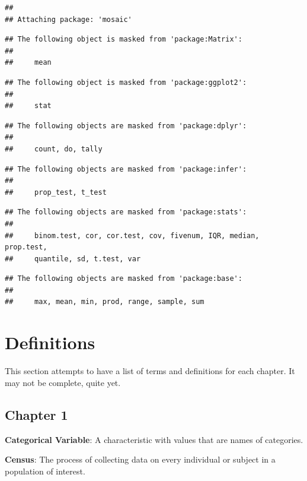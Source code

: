 \documentclass[
]{book}
\begin{document}
\begin{verbatim}
## 
## Attaching package: 'mosaic'
\end{verbatim}

\begin{verbatim}
## The following object is masked from 'package:Matrix':
## 
##     mean
\end{verbatim}

\begin{verbatim}
## The following object is masked from 'package:ggplot2':
## 
##     stat
\end{verbatim}

\begin{verbatim}
## The following objects are masked from 'package:dplyr':
## 
##     count, do, tally
\end{verbatim}

\begin{verbatim}
## The following objects are masked from 'package:infer':
## 
##     prop_test, t_test
\end{verbatim}

\begin{verbatim}
## The following objects are masked from 'package:stats':
## 
##     binom.test, cor, cor.test, cov, fivenum, IQR, median, prop.test,
##     quantile, sd, t.test, var
\end{verbatim}

\begin{verbatim}
## The following objects are masked from 'package:base':
## 
##     max, mean, min, prod, range, sample, sum
\end{verbatim}

\hypertarget{definitions}{%
\chapter{Definitions}\label{definitions}}

This section attempts to have a list of terms and definitions for each chapter. It may not be complete, quite yet.

\hypertarget{chapter-1}{%
\section{Chapter 1}\label{chapter-1}}

\textbf{Categorical Variable}: A characteristic with values that are names of categories.

\textbf{Census}: The process of collecting data on every individual or subject in a population of interest.
\end{document}
